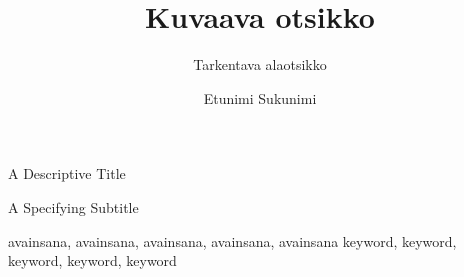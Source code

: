 \documentclass[authoryear, arial]{tauthesis}
\begin{document}

\frontmatter


\title{Kuvaava otsikko}{A Descriptive Title}
\subtitle{Tarkentava alaotsikko}{A Specifying Subtitle}

\author{Etunimi Sukunimi}





\keywords%
    {avainsana, avainsana, avainsana, avainsana, avainsana}
    {keyword, keyword, keyword, keyword, keyword}

\maketitle


\end{document}
